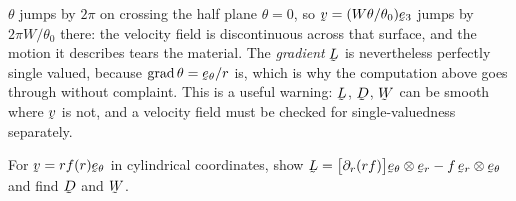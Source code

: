 \begin{remark}
\label{rem:P9multi}
$\theta$ jumps by $2\pi$ on crossing the half plane $\theta=0$, so
$\bv=(W\theta/\theta_{0})\be_{3}$ jumps by $2\pi W/\theta_{0}$ there: the
velocity field is discontinuous across that surface, and the motion it
describes tears the material. The \emph{gradient} $\bL$ is nevertheless
perfectly single valued, because $\grad\theta=\bet/r$ is, which is why the
computation above goes through without complaint. This is a useful warning:
$\bL$, $\bD$, $\bW$ can be smooth where $\bv$ is not, and a velocity field
must be checked for single-valuedness separately.
\end{remark}

\begin{problem}
For $\bv=rf(r)\bet$ in cylindrical coordinates, show
$\bL=\big[\partial_{r}(rf)\big]\bet\otimes\ber-f\,\ber\otimes\bet$ and
find $\bD$ and $\bW$.
\end{problem}

